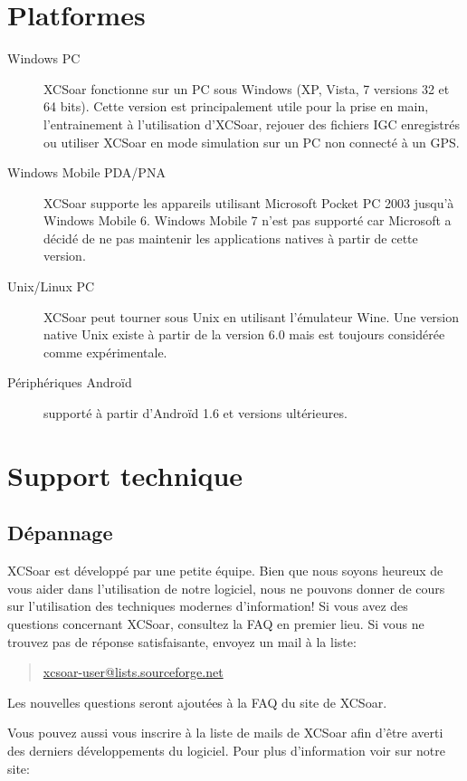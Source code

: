 \section{Platformes}
\begin{description}
\item[Windows PC]
XCSoar fonctionne sur un PC sous Windows (XP, Vista, 7 versions 32 et 64 bits). Cette version est principalement utile pour la prise en main, l'entrainement à l'utilisation d'XCSoar, rejouer des fichiers IGC enregistrés ou utiliser XCSoar en mode simulation sur un PC non connecté à un GPS.
\item[Windows Mobile PDA/PNA]
XCSoar supporte les appareils utilisant Microsoft Pocket PC 2003 jusqu'à Windows Mobile 6. Windows Mobile 7 n'est pas supporté car Microsoft a décidé de ne pas maintenir les applications natives à partir de cette version.  
\item[Unix/Linux PC]
XCSoar peut tourner sous Unix en utilisant l'émulateur Wine. Une version native Unix existe à partir de la version 6.0 mais est toujours considérée comme expérimentale.     
\item[Périphériques Androïd] supporté à partir d'Androïd 1.6 et versions ultérieures.
\end{description}



\section{Support technique}

\subsection*{Dépannage}
XCSoar est développé par une petite équipe. Bien que nous soyons heureux de vous aider dans l'utilisation de notre logiciel, nous ne pouvons donner de cours sur l'utilisation des techniques modernes d'information!
Si vous avez des questions concernant XCSoar, consultez la FAQ en premier lieu. Si vous ne trouvez pas de réponse satisfaisante, envoyez un mail à la liste:
\begin{quote}
\href{mailto:xcsoar-user@lists.sourceforge.net}{xcsoar-user@lists.sourceforge.net}
\end{quote}

Les nouvelles questions seront ajoutées à la FAQ du site de XCSoar. 

Vous pouvez aussi vous inscrire à la liste de mails de XCSoar afin d'être averti des derniers développements du logiciel. Pour plus d'information voir sur notre site:
\begin{quote}
\end{quote}

